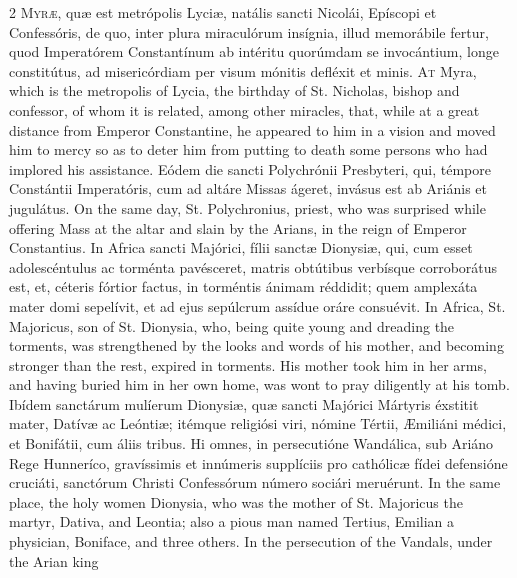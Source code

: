 \begin{paracol}{2}
\lettrine[lines=2]{M}{yræ,} quæ est 
 metrópolis Lyciæ, natális sancti Nicolái, Epíscopi et Confessóris, de quo, 
 inter plura miraculórum insígnia, illud memorábile fertur, quod Imperatórem 
 Constantínum ab intéritu quorúmdam se invocántium, longe constitútus, ad 
 misericórdiam per visum mónitis defléxit et minis.
\switchcolumn
{}
\lettrine[lines=2]{A}{t} Myra, which is the metropolis of 
 Lycia, the birthday of St. Nicholas, bishop and confessor, of whom it is 
 related, among other miracles, that, while at a great distance from Emperor 
 Constantine, he appeared to him in a vision and moved him to mercy so as to 
 deter him from putting to death some persons who had implored his 
 assistance.
\switchcolumn*
{}
Eódem die sancti 
 Polychrónii Presbyteri, qui, témpore Constántii Imperatóris, cum ad altáre 
 Missas ágeret, invásus est ab Ariánis et jugulátus.
\switchcolumn
{}
On the same day, St. Polychronius, 
 priest, who was surprised while offering Mass at the altar and slain by the 
 Arians, in the reign of Emperor Constantius.
\switchcolumn*
{}
In Africa sancti 
 Majórici, fílii sanctæ Dionysiæ, qui, cum esset adolescéntulus ac torménta 
 pavésceret, matris obtútibus verbísque corroborátus est, et, céteris fórtior 
 factus, in torméntis ánimam réddidit; quem amplexáta mater domi sepelívit, 
 et ad ejus sepúlcrum assídue oráre consuévit.
\switchcolumn
{}
In Africa, St. Majoricus, son of St. 
 Dionysia, who, being quite young and dreading the torments, was strengthened 
 by the looks and words of his mother, and becoming stronger than the rest, 
 expired in torments. His mother took him in her arms, and having 
 buried him in her own home, was wont to pray diligently at his tomb.
\switchcolumn*
{}
Ibídem sanctárum 
 mulíerum Dionysiæ, quæ sancti Majórici Mártyris éxstitit mater, Datívæ ac 
 Leóntiæ; itémque religiósi viri, nómine Tértii, Æmiliáni médici, et 
 Bonifátii, cum áliis tribus. Hi omnes, in persecutióne Wandálica, sub 
 Ariáno Rege Hunneríco, gravíssimis et innúmeris supplíciis pro cathólicæ 
 fídei defensióne cruciáti, sanctórum Christi Confessórum número sociári 
 meruérunt.
\switchcolumn
{}
In the same place, the holy women 
 Dionysia, who was the mother of St. Majoricus the martyr, Dativa, and Leontia; 
 also a pious man named Tertius, Emilian a physician, Boniface, and three 
 others. In the persecution of the Vandals, under the Arian king 

\end{paracol}
